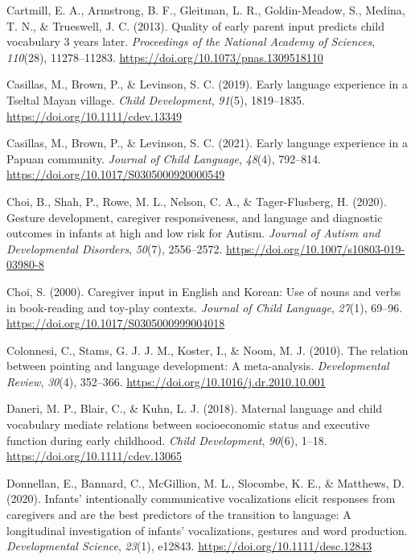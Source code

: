 \documentclass[
  english,
  man,mask]{apa6}
\begin{document}
\leavevmode\hypertarget{ref-cartmill_quality_2013}{}%
Cartmill, E. A., Armstrong, B. F., Gleitman, L. R., Goldin-Meadow, S., Medina, T. N., \& Trueswell, J. C. (2013). Quality of early parent input predicts child vocabulary 3 years later. \emph{Proceedings of the National Academy of Sciences}, \emph{110}(28), 11278--11283. \url{https://doi.org/10.1073/pnas.1309518110}

\leavevmode\hypertarget{ref-casillas_early_2019}{}%
Casillas, M., Brown, P., \& Levinson, S. C. (2019). Early language experience in a Tseltal Mayan village. \emph{Child Development}, \emph{91}(5), 1819--1835. \url{https://doi.org/10.1111/cdev.13349}

\leavevmode\hypertarget{ref-casillas_early_2021}{}%
Casillas, M., Brown, P., \& Levinson, S. C. (2021). Early language experience in a Papuan community. \emph{Journal of Child Language}, \emph{48}(4), 792--814. \url{https://doi.org/10.1017/S0305000920000549}

\leavevmode\hypertarget{ref-choi_gesture_2020}{}%
Choi, B., Shah, P., Rowe, M. L., Nelson, C. A., \& Tager-Flusberg, H. (2020). Gesture development, caregiver responsiveness, and language and diagnostic outcomes in infants at high and low risk for Autism. \emph{Journal of Autism and Developmental Disorders}, \emph{50}(7), 2556--2572. \url{https://doi.org/10.1007/s10803-019-03980-8}

\leavevmode\hypertarget{ref-choi_caregiver_2000}{}%
Choi, S. (2000). Caregiver input in English and Korean: Use of nouns and verbs in book-reading and toy-play contexts. \emph{Journal of Child Language}, \emph{27}(1), 69--96. \url{https://doi.org/10.1017/S0305000999004018}

\leavevmode\hypertarget{ref-colonnesi_relation_2010}{}%
Colonnesi, C., Stams, G. J. J. M., Koster, I., \& Noom, M. J. (2010). The relation between pointing and language development: A meta-analysis. \emph{Developmental Review}, \emph{30}(4), 352--366. \url{https://doi.org/10.1016/j.dr.2010.10.001}

\leavevmode\hypertarget{ref-daneri_maternal_2018}{}%
Daneri, M. P., Blair, C., \& Kuhn, L. J. (2018). Maternal language and child vocabulary mediate relations between socioeconomic status and executive function during early childhood. \emph{Child Development}, \emph{90}(6), 1--18. \url{https://doi.org/10.1111/cdev.13065}

\leavevmode\hypertarget{ref-donnellan_infants_2020}{}%
Donnellan, E., Bannard, C., McGillion, M. L., Slocombe, K. E., \& Matthews, D. (2020). Infants' intentionally communicative vocalizations elicit responses from caregivers and are the best predictors of the transition to language: A longitudinal investigation of infants' vocalizations, gestures and word production. \emph{Developmental Science}, \emph{23}(1), e12843. \url{https://doi.org/10.1111/desc.12843}
\end{document}
